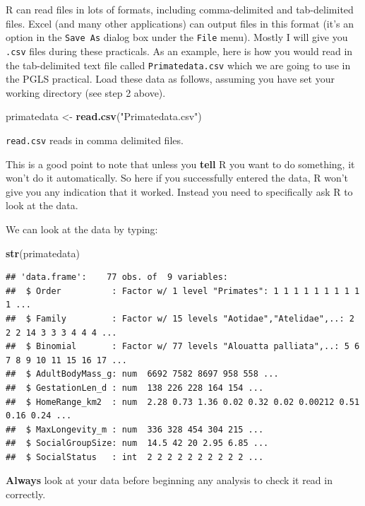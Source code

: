 \documentclass[]{book}
\newenvironment{Shaded}{\begin{snugshade}}{\end{snugshade}}
\newcommand{\KeywordTok}[1]{\textcolor[rgb]{0.13,0.29,0.53}{\textbf{{#1}}}}
\newcommand{\StringTok}[1]{\textcolor[rgb]{0.31,0.60,0.02}{{#1}}}
\newcommand{\NormalTok}[1]{{#1}}
\theoremstyle{definition}
\theoremstyle{definition}
\theoremstyle{definition}
\theoremstyle{remark}
\begin{document}
R can read files in lots of formats, including comma-delimited and
tab-delimited files. Excel (and many other applications) can output
files in this format (it's an option in the \texttt{Save\ As} dialog box
under the \texttt{File} menu). Mostly I will give you \texttt{.csv}
files during these practicals. As an example, here is how you would read
in the tab-delimited text file called \texttt{Primatedata.csv} which we
are going to use in the PGLS practical. Load these data as follows,
assuming you have set your working directory (see step 2 above).

\begin{Shaded}
\begin{Highlighting}[]
\NormalTok{primatedata <-}\StringTok{ }\KeywordTok{read.csv}\NormalTok{(}\StringTok{"Primatedata.csv"}\NormalTok{)}
\end{Highlighting}
\end{Shaded}

\texttt{read.csv} reads in comma delimited files.

This is a good point to note that unless you \textbf{tell} R you want to
do something, it won't do it automatically. So here if you successfully
entered the data, R won't give you any indication that it worked.
Instead you need to specifically ask R to look at the data.

We can look at the data by typing:

\begin{Shaded}
\begin{Highlighting}[]
\KeywordTok{str}\NormalTok{(primatedata)}
\end{Highlighting}
\end{Shaded}

\begin{verbatim}
## 'data.frame':    77 obs. of  9 variables:
##  $ Order          : Factor w/ 1 level "Primates": 1 1 1 1 1 1 1 1 1 1 ...
##  $ Family         : Factor w/ 15 levels "Aotidae","Atelidae",..: 2 2 2 14 3 3 3 4 4 4 ...
##  $ Binomial       : Factor w/ 77 levels "Alouatta palliata",..: 5 6 7 8 9 10 11 15 16 17 ...
##  $ AdultBodyMass_g: num  6692 7582 8697 958 558 ...
##  $ GestationLen_d : num  138 226 228 164 154 ...
##  $ HomeRange_km2  : num  2.28 0.73 1.36 0.02 0.32 0.02 0.00212 0.51 0.16 0.24 ...
##  $ MaxLongevity_m : num  336 328 454 304 215 ...
##  $ SocialGroupSize: num  14.5 42 20 2.95 6.85 ...
##  $ SocialStatus   : int  2 2 2 2 2 2 2 2 2 2 ...
\end{verbatim}

\textbf{Always} look at your data before beginning any analysis to check
it read in correctly.
\end{document}
